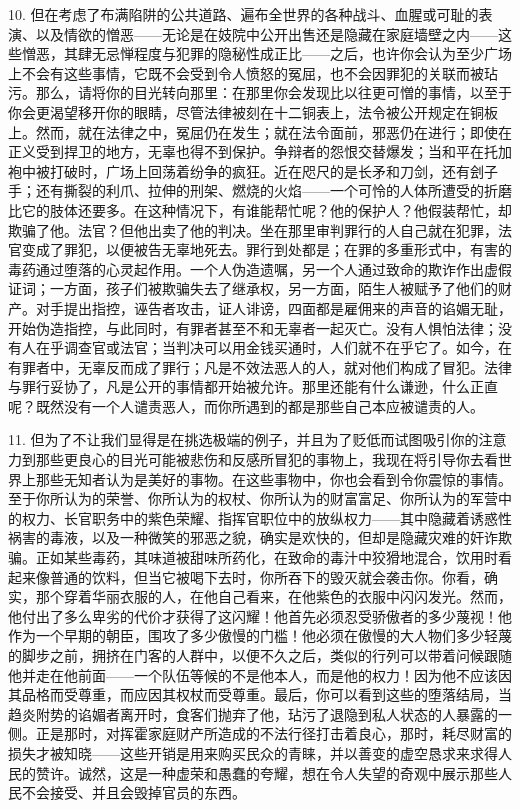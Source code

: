 10. 但在考虑了布满陷阱的公共道路、遍布全世界的各种战斗、血腥或可耻的表演、以及情欲的憎恶——无论是在妓院中公开出售还是隐藏在家庭墙壁之内——这些憎恶，其肆无忌惮程度与犯罪的隐秘性成正比——之后，也许你会认为至少广场上不会有这些事情，它既不会受到令人愤怒的冤屈，也不会因罪犯的关联而被玷污。那么，请将你的目光转向那里：在那里你会发现比以往更可憎的事情，以至于你会更渴望移开你的眼睛，尽管法律被刻在十二铜表上，法令被公开规定在铜板上。然而，就在法律之中，冤屈仍在发生；就在法令面前，邪恶仍在进行；即使在正义受到捍卫的地方，无辜也得不到保护。争辩者的怨恨交替爆发；当和平在托加袍中被打破时，广场上回荡着纷争的疯狂。近在咫尺的是长矛和刀剑，还有刽子手；还有撕裂的利爪、拉伸的刑架、燃烧的火焰——一个可怜的人体所遭受的折磨比它的肢体还要多。在这种情况下，有谁能帮忙呢？他的保护人？他假装帮忙，却欺骗了他。法官？但他出卖了他的判决。坐在那里审判罪行的人自己就在犯罪，法官变成了罪犯，以便被告无辜地死去。罪行到处都是；在罪的多重形式中，有害的毒药通过堕落的心灵起作用。一个人伪造遗嘱，另一个人通过致命的欺诈作出虚假证词；一方面，孩子们被欺骗失去了继承权，另一方面，陌生人被赋予了他们的财产。对手提出指控，诬告者攻击，证人诽谤，四面都是雇佣来的声音的谄媚无耻，开始伪造指控，与此同时，有罪者甚至不和无辜者一起灭亡。没有人惧怕法律；没有人在乎调查官或法官；当判决可以用金钱买通时，人们就不在乎它了。如今，在有罪者中，无辜反而成了罪行；凡是不效法恶人的人，就对他们构成了冒犯。法律与罪行妥协了，凡是公开的事情都开始被允许。那里还能有什么谦逊，什么正直呢？既然没有一个人谴责恶人，而你所遇到的都是那些自己本应被谴责的人。\par

11. 但为了不让我们显得是在挑选极端的例子，并且为了贬低而试图吸引你的注意力到那些更良心的目光可能被悲伤和反感所冒犯的事物上，我现在将引导你去看世界上那些无知者认为是美好的事物。在这些事物中，你也会看到令你震惊的事情。至于你所认为的荣誉、你所认为的权杖、你所认为的财富富足、你所认为的军营中的权力、长官职务中的紫色荣耀、指挥官职位中的放纵权力——其中隐藏着诱惑性祸害的毒液，以及一种微笑的邪恶之貌，确实是欢快的，但却是隐藏灾难的奸诈欺骗。正如某些毒药，其味道被甜味所药化，在致命的毒汁中狡猾地混合，饮用时看起来像普通的饮料，但当它被喝下去时，你所吞下的毁灭就会袭击你。你看，确实，那个穿着华丽衣服的人，在他自己看来，在他紫色的衣服中闪闪发光。然而，他付出了多么卑劣的代价才获得了这闪耀！他首先必须忍受骄傲者的多少蔑视！他作为一个早期的朝臣，围攻了多少傲慢的门槛！他必须在傲慢的大人物们多少轻蔑的脚步之前，拥挤在门客的人群中，以便不久之后，类似的行列可以带着问候跟随他并走在他前面——一个队伍等候的不是他本人，而是他的权力！因为他不应该因其品格而受尊重，而应因其权杖而受尊重。最后，你可以看到这些的堕落结局，当趋炎附势的谄媚者离开时，食客们抛弃了他，玷污了退隐到私人状态的人暴露的一侧。正是那时，对挥霍家庭财产所造成的不法行径打击着良心，那时，耗尽财富的损失才被知晓——这些开销是用来购买民众的青睐，并以善变的虚空恳求来求得人民的赞许。诚然，这是一种虚荣和愚蠢的夸耀，想在令人失望的奇观中展示那些人民不会接受、并且会毁掉官员的东西。\par

